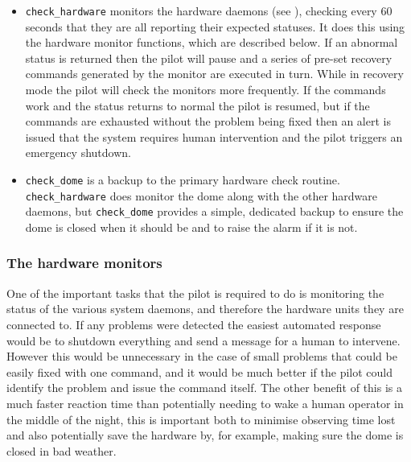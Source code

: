 \begin{colsection}
\begin{colsection}
\begin{itemize}
\item \texttt{check\_hardware} monitors the hardware daemons (see ), checking every 60 seconds that they are all reporting their expected statuses. It does this using the hardware monitor functions, which are described below. If an abnormal status is returned then the pilot will pause and a series of pre-set recovery commands generated by the monitor are executed in turn. While in recovery mode the pilot will check the monitors more frequently. If the commands work and the status returns to normal the pilot is resumed, but if the commands are exhausted without the problem being fixed then an alert is issued that the system requires human intervention and the pilot triggers an emergency shutdown.

\item \texttt{check\_dome} is a backup to the primary hardware check routine. \texttt{check\_hardware} does monitor the dome along with the other hardware daemons, but \texttt{check\_dome} provides a simple, dedicated backup to ensure the dome is closed when it should be and to raise the alarm if it is not.

\end{itemize}

\subsubsection{The hardware monitors}

One of the important tasks that the pilot is required to do is monitoring the status of the various system daemons, and therefore the hardware units they are connected to. If any problems were detected the easiest automated response would be to shutdown everything and send a message for a human to intervene. However this would be unnecessary in the case of small problems that could be easily fixed with one command, and it would be much better if the pilot could identify the problem and issue the command itself. The other benefit of this is a much faster reaction time than potentially needing to wake a human operator in the middle of the night, this is important both to minimise observing time lost and also potentially save the hardware by, for example, making sure the dome is closed in bad weather.


\end{colsection}
\end{colsection}
